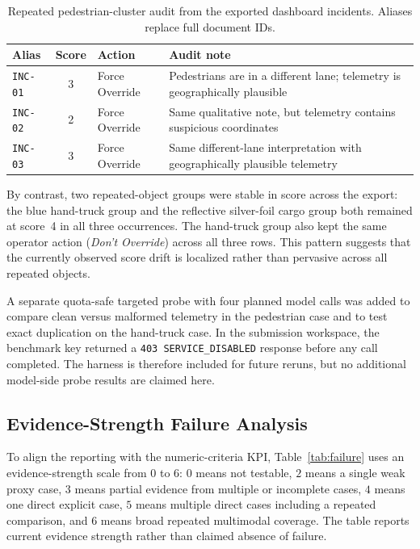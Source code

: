 \documentclass[conference]{IEEEtran}
\newcommand{\codefont}[1]{\texttt{#1}}
\begin{document}
\begin{table}[t]
\caption{Repeated pedestrian-cluster audit from the exported dashboard incidents. Aliases replace full document IDs.}
\label{tab:repeatped}
\centering
\footnotesize
\begin{tabularx}{\linewidth}{@{}lclX@{}}
\toprule
Alias & Score & Action & Audit note \\
\midrule
\codefont{INC-01} & 3 & Force Override & Pedestrians are in a different lane; telemetry is geographically plausible \\
\codefont{INC-02} & 2 & Force Override & Same qualitative note, but telemetry contains suspicious coordinates \\
\codefont{INC-03} & 3 & Force Override & Same different-lane interpretation with geographically plausible telemetry \\
\bottomrule
\end{tabularx}
\end{table}

\noindent By contrast, two repeated-object groups were stable in score across the export: the blue hand-truck group and the reflective silver-foil cargo group both remained at score~4 in all three occurrences. The hand-truck group also kept the same operator action (\emph{Don't Override}) across all three rows. This pattern suggests that the currently observed score drift is localized rather than pervasive across all repeated objects.

\noindent A separate quota-safe targeted probe with four planned model calls was added to compare clean versus malformed telemetry in the pedestrian case and to test exact duplication on the hand-truck case. In the submission workspace, the benchmark key returned a \codefont{403 SERVICE\_DISABLED} response before any call completed. The harness is therefore included for future reruns, but no additional model-side probe results are claimed here.

\subsection{Evidence-Strength Failure Analysis}
To align the reporting with the numeric-criteria KPI, Table~\ref{tab:failure} uses an evidence-strength scale from \(0\) to \(6\): \(0\) means not testable, \(2\) means a single weak proxy case, \(3\) means partial evidence from multiple or incomplete cases, \(4\) means one direct explicit case, \(5\) means multiple direct cases including a repeated comparison, and \(6\) means broad repeated multimodal coverage. The table reports current evidence strength rather than claimed absence of failure.
\end{document}
